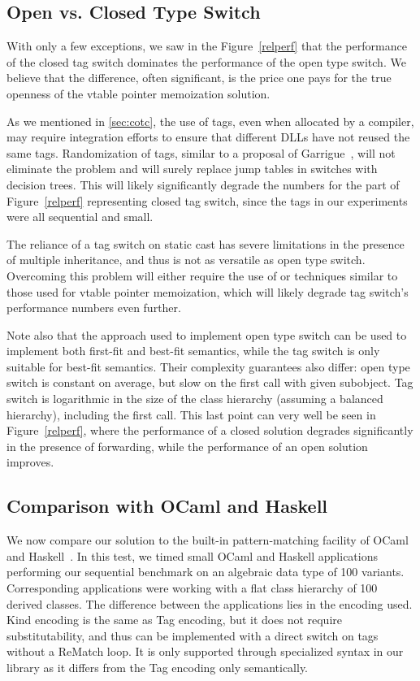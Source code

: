 \subsection{Open vs. Closed Type Switch}
\label{sec:cmp}

With only a few exceptions, we saw in the Figure~\ref{relperf} that the 
performance of the closed tag switch dominates the performance of the open type 
switch. We believe that the difference, often significant, is the price one pays 
for the true openness of the vtable pointer memoization solution.

As we mentioned in \textsection\ref{sec:cotc}, the use of tags, even when allocated 
by a compiler, may require integration efforts to ensure that different DLLs have 
not reused the same tags. Randomization of tags, similar to a proposal of 
Garrigue~\cite{garrigue-98}, will not eliminate the problem and will surely 
replace jump tables in switches with decision trees. This will likely 
significantly degrade the numbers for the part of Figure~\ref{relperf} 
representing closed tag switch, since the tags in our experiments were all 
sequential and small. 

The reliance of a tag switch on static cast has severe limitations in the 
presence of multiple inheritance, and thus is not as versatile as open type 
switch. Overcoming this problem will either require the use of 
 or techniques similar to those used for vtable pointer 
memoization, which will likely degrade tag switch's performance numbers even 
further.

Note also that the approach used to implement open type switch can be used to 
implement both first-fit and best-fit semantics, while the tag switch is only suitable 
for best-fit semantics. Their complexity guarantees also differ: open type 
switch is constant on average, but slow on the first call with given subobject. 
Tag switch is logarithmic in the size of the class hierarchy 
(assuming a balanced hierarchy), including the first call. This last point can 
very well be seen in Figure~\ref{relperf}, where the performance of a closed solution
degrades significantly in the presence of forwarding, while the performance of an
open solution improves.

\subsection{Comparison with OCaml and Haskell}
\label{sec:ocaml}

We now compare our solution to the built-in pattern-matching facility of 
OCaml~\cite{OPM01} and Haskell~\cite{Haskell98Book}.  
In this test, we timed small OCaml and Haskell applications performing our sequential 
benchmark on an algebraic data type of 100 variants. Corresponding \Cpp{} 
applications were working with a flat class hierarchy of 100 derived classes. 
The difference between the \Cpp{} applications lies in the encoding used. Kind 
encoding is the same as Tag encoding, but it does not require substitutability, 
and thus can be implemented with a direct switch on tags without a ReMatch loop. 
It is only supported through specialized syntax in our library as it differs 
from the Tag encoding only semantically.

